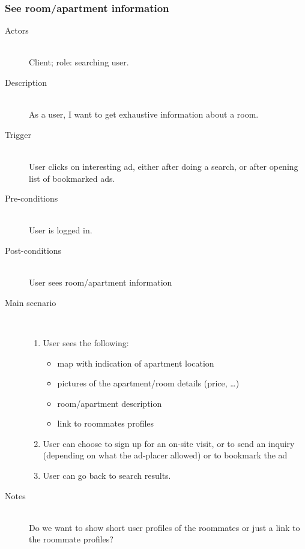 \documentclass[a4wide]{article}
\begin{document}
\subsubsection{See room/apartment information}
\begin{description}
\item[Actors]\mbox{}\\
Client; role: searching user.

\item[Description]\mbox{}\\
As a user, I want to get exhaustive information about a room.

\item[Trigger]\mbox{}\\
User clicks on interesting ad, either after doing a search, or after opening list of bookmarked ads.

\item[Pre-conditions]\mbox{}\\
User is logged in.

\item[Post-conditions]\mbox{}\\
User sees room/apartment information

\item[Main scenario]\mbox{}\\
\begin{enumerate}
\item User sees the following:    
\begin{itemize}
\item map with indication of apartment location
\item pictures of the apartment/room details (price, …)
\item room/apartment description
\item link to roommates profiles
\end{itemize}
\item User can choose to sign up for an on-site visit, or to send an inquiry (depending on what the ad-placer allowed) or to bookmark the ad
\item User can go back to search results.
\end{enumerate}
\item[Notes]\mbox{}\\
Do we want to show short user profiles of the roommates or just a link to the roommate profiles?
\end{description}
\end{document}
